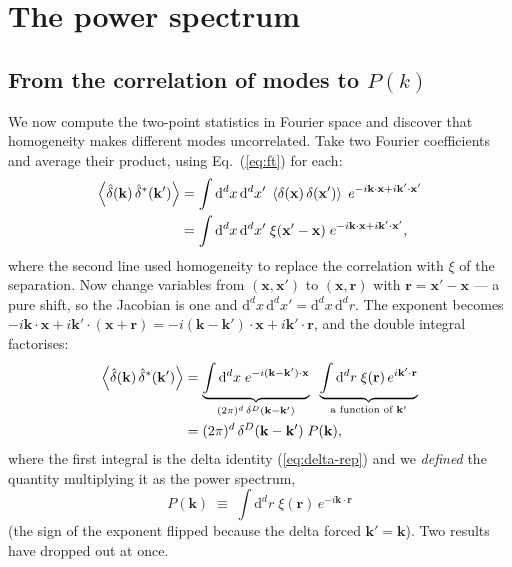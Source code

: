 \documentclass[12pt]{article}
\newcommand{\bk}{\mathbf{k}}
\newcommand{\bx}{\mathbf{x}}
\newcommand{\br}{\mathbf{r}}
\newcommand{\avg}[1]{\left\langle #1 \right\rangle}
\begin{document}
\section{The power spectrum}
\label{sec:pk}

\subsection{From the correlation of modes to $P(k)$}
\label{sec:pk-derive}

We now compute the two-point statistics in Fourier space and discover
that homogeneity makes different modes uncorrelated.  Take two Fourier
coefficients and average their product, using Eq.~(\ref{eq:ft}) for
each:
\begin{align}
  \avg{\hat\delta(\bk)\,\hat\delta^*(\bk')}
  &= \int \mathrm d^d x\,\mathrm d^d x'\;
     \avg{\delta(\bx)\,\delta(\bx')}\;
     e^{-i\bk\cdot\bx + i\bk'\cdot\bx'} \notag\\
  &= \int \mathrm d^d x\,\mathrm d^d x'\;
     \xi(\bx' - \bx)\;
     e^{-i\bk\cdot\bx + i\bk'\cdot\bx'},
  \label{eq:pk-step1}
\end{align}
where the second line used homogeneity to replace the correlation with
$\xi$ of the separation.  Now change variables from $(\bx, \bx')$ to
$(\bx, \br)$ with $\br = \bx' - \bx$ --- a pure shift, so the Jacobian is
one and $\mathrm d^d x\,\mathrm d^d x' = \mathrm d^d x\,\mathrm d^d r$.
The exponent becomes
$-i\bk\cdot\bx + i\bk'\cdot(\bx + \br) = -i(\bk - \bk')\cdot\bx +
i\bk'\cdot\br$, and the double integral factorises:
\begin{align}
  \avg{\hat\delta(\bk)\,\hat\delta^*(\bk')}
  &= \underbrace{\int \mathrm d^d x\; e^{-i(\bk-\bk')\cdot\bx}}_{(2\pi)^d\,\delta^D(\bk-\bk')}
     \;\;\underbrace{\int \mathrm d^d r\; \xi(\br)\,e^{i\bk'\cdot\br}}_{\text{a function of }\bk'} \notag\\
  &= (2\pi)^d\,\delta^D(\bk - \bk')\;P(\bk),
  \label{eq:pk-def}
\end{align}
where the first integral is the delta identity (\ref{eq:delta-rep}) and
we \emph{defined} the quantity multiplying it as the power spectrum,
\begin{equation}
  \boxed{\;P(\bk) \;\equiv\; \int \mathrm d^d r\; \xi(\br)\,e^{-i\bk\cdot\br}\;}
  \label{eq:wiener-khinchin}
\end{equation}
(the sign of the exponent flipped because the delta forced $\bk' = \bk$).
Two results have dropped out at once.
\end{document}
